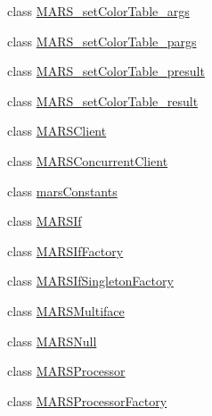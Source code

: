 \begin{DoxyCompactItemize}
\item 
class \hyperlink{classMARS_1_1MARS__setColorTable__args}{M\+A\+R\+S\+\_\+set\+Color\+Table\+\_\+args}
\item 
class \hyperlink{classMARS_1_1MARS__setColorTable__pargs}{M\+A\+R\+S\+\_\+set\+Color\+Table\+\_\+pargs}
\item 
class \hyperlink{classMARS_1_1MARS__setColorTable__presult}{M\+A\+R\+S\+\_\+set\+Color\+Table\+\_\+presult}
\item 
class \hyperlink{classMARS_1_1MARS__setColorTable__result}{M\+A\+R\+S\+\_\+set\+Color\+Table\+\_\+result}
\item 
class \hyperlink{classMARS_1_1MARSClient}{M\+A\+R\+S\+Client}
\item 
class \hyperlink{classMARS_1_1MARSConcurrentClient}{M\+A\+R\+S\+Concurrent\+Client}
\item 
class \hyperlink{classMARS_1_1marsConstants}{mars\+Constants}
\item 
class \hyperlink{classMARS_1_1MARSIf}{M\+A\+R\+S\+If}
\item 
class \hyperlink{classMARS_1_1MARSIfFactory}{M\+A\+R\+S\+If\+Factory}
\item 
class \hyperlink{classMARS_1_1MARSIfSingletonFactory}{M\+A\+R\+S\+If\+Singleton\+Factory}
\item 
class \hyperlink{classMARS_1_1MARSMultiface}{M\+A\+R\+S\+Multiface}
\item 
class \hyperlink{classMARS_1_1MARSNull}{M\+A\+R\+S\+Null}
\item 
class \hyperlink{classMARS_1_1MARSProcessor}{M\+A\+R\+S\+Processor}
\item 
class \hyperlink{classMARS_1_1MARSProcessorFactory}{M\+A\+R\+S\+Processor\+Factory}
\end{DoxyCompactItemize}
